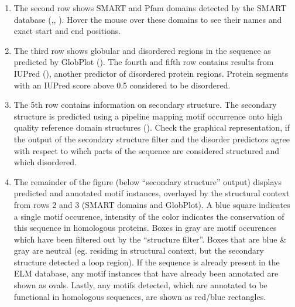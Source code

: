 \begin{enumerate}
\item The second row shows SMART and Pfam domains detected by the SMART
	database (\cite{9600884},\cite{25300481}, \cite{9600884}). Hover the
	mouse over these domains to see their names and exact start and end
	positions.


\item The third row shows globular and disordered regions in the sequence as
	predicted by GlobPlot (\cite{12824398}). The fourth and fifth row
	contains results from IUPred (\cite{15955779}), another predictor of
	disordered protein regions. Protein segments with an IUPred score above
	0.5 considered to be disordered.


\item The 5th row contains information on secondary structure. The secondary
	structure is predicted using a pipeline mapping motif occurrence onto
	high quality reference domain structures (\cite{19852836}). Check the
	graphical representation, if the output of the secondary structure
	filter and the disorder predictors agree with respect to wihch parts of
	the sequence are considered structured and which disordered.

\item The remainder of the figure (below ``secondary structure'' output)
	displays predicted and annotated motif instances, overlayed by the
	structural context from rows 2 and 3 (SMART domains and GlobPlot). A
	blue square indicates a single motif occurence, intensity of the color
	indicates the conservation of this sequence in homologous proteins.
	Boxes in gray are motif occurences which have been filtered out by the
	``structure filter''. Boxes that are blue \& gray are neutral (eg.
	residing in structural context, but the secondary structure detected a
	loop region). If the sequence is already present in the ELM database,
	any motif instances that have already been annotated are shown as
	ovals.  Lastly, any motifs detected, which are annotated to be
	functional in homologous sequences, are shown as red/blue rectangles.


\end{enumerate}
